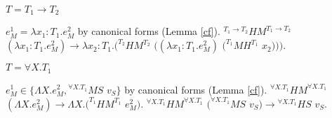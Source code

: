 \begin{case}
\begin{subcase}
\end{subcase}

\begin{subcase}

$T=T_{1}\rightarrow T_{2}$

$e_{M}^{1}=\lambda x_{1}:T_{1}.e_{M}^{2}$ by canonical forms (Lemma \ref{cf}).  $^{T_{1}\rightarrow T_{2}}HM^{T_{1}\rightarrow T_{2}}$ $(\lambda x_{1}:T_{1}.e_{M}^{2})\rightarrow\lambda x_{2}:T_{1}.(^{T_{2}}HM^{T_{2}}$ $((\lambda x_{1}:T_{1}.e_{M}^{2})$ $(^{T_{1}}MH^{T_{1}}$ $x_{2})))$.

\end{subcase}

\begin{subcase}

$T=\forall X.T_{1}$

$e_{M}^{1}\in\lbrace\Lambda X.e_{M}^{2},{^{\forall X.T_{1}}M}S$ $v_{S}\rbrace$ by canonical forms (Lemma \ref{cf}).  $^{\forall X.T_{1}}HM^{\forall X.T_{1}}$ $(\Lambda X.e_{M}^{2})\rightarrow\Lambda X.(^{T_{1}}HM^{T_{1}}$ $e_{M}^{2})$.  $^{\forall X.T_{1}}HM^{\forall X.T_{1}}$ $(^{\forall X.T_{1}}MS$ $v_{S})\rightarrow{^{\forall X.T_{1}}H}S$ $v_{S}$.

\end{subcase}

\end{case}